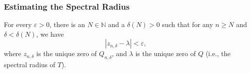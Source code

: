 \documentclass{beamer}
\newcommand{\N}{\mathbb{N}}
\newcommand{\dd}{{\delta}}
\newcommand{\ee}{{\varepsilon}}
\begin{document}
\begin{frame}
	\frametitle{Estimating the Spectral Radius}
	\begin{theorem}[R., 2020]
		For every $\ee>0$, there is an $N \in \N$ and a $\dd(N) >0$ such that for any $n \geq N$ and $\dd < \dd(N)$, we have
		\[|z_{n,\dd} - \lambda| < \ee, \]
		where $z_{n,\dd}$ is the unique zero of $Q_{n, \dd}$, and $\lambda$ is the unique zero of $Q$ (i.e., the spectral radius of $T$). 
	\end{theorem}
\end{frame}

\end{document}

